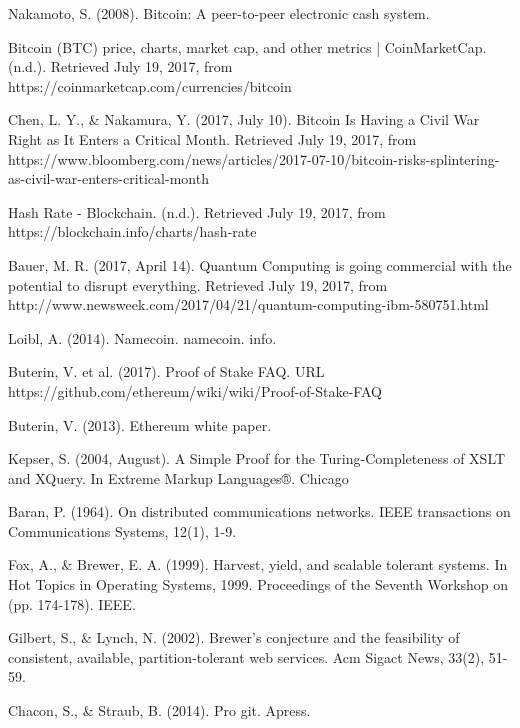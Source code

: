 \begin{thebibliography}{99}
Nakamoto, S. (2008). Bitcoin: A peer-to-peer electronic cash system.

Bitcoin (BTC) price, charts, market cap, and other metrics | CoinMarketCap. (n.d.). Retrieved July 19, 2017, from https://coinmarketcap.com/currencies/bitcoin

Chen, L. Y., \& Nakamura, Y. (2017, July 10). Bitcoin Is Having a Civil War Right as It Enters a Critical Month. Retrieved July 19, 2017, from https://www.bloomberg.com/news/articles/2017-07-10/bitcoin-risks-splintering-as-civil-war-enters-critical-month

Hash Rate - Blockchain. (n.d.). Retrieved July 19, 2017, from https://blockchain.info/charts/hash-rate

Bauer, M. R. (2017, April 14). Quantum Computing is going commercial with the potential to disrupt everything. Retrieved July 19, 2017, from http://www.newsweek.com/2017/04/21/quantum-computing-ibm-580751.html

Loibl, A. (2014). Namecoin. namecoin. info.

Buterin, V. et al. (2017). Proof of Stake FAQ. URL https://github.com/ethereum/wiki/wiki/Proof-of-Stake-FAQ

Buterin, V. (2013). Ethereum white paper.

Kepser, S. (2004, August). A Simple Proof for the Turing-Completeness of XSLT and XQuery. In Extreme Markup Languages®.
Chicago 


Baran, P. (1964). On distributed communications networks. IEEE transactions on Communications Systems, 12(1), 1-9.

Fox, A., \& Brewer, E. A. (1999). Harvest, yield, and scalable tolerant systems. In Hot Topics in Operating Systems, 1999. Proceedings of the Seventh Workshop on (pp. 174-178). IEEE.

Gilbert, S., \& Lynch, N. (2002). Brewer's conjecture and the feasibility of consistent, available, partition-tolerant web services. Acm Sigact News, 33(2), 51-59.

Chacon, S., \& Straub, B. (2014). Pro git. Apress.


\end{thebibliography}

